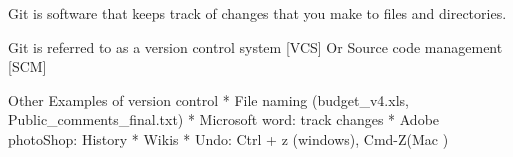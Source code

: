 Git is software that keeps track of changes that you make to files and directories.

Git is referred to as a version control system [VCS]
Or Source code management [SCM]

Other Examples of version control 
  * File naming (budget_v4.xls, Public_comments_final.txt)
  * Microsoft word: track changes 
  * Adobe photoShop: History 
  * Wikis
  * Undo: Ctrl + z (windows), Cmd-Z(Mac )